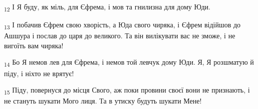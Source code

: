 \begin{tcolorbox}
\textsubscript{12} І Я буду, як міль, для Єфрема, і мов та гнилизна для дому Юди.
\end{tcolorbox}
\begin{tcolorbox}
\textsubscript{13} І побачив Єфрем свою хворість, а Юда свого чиряка, і Єфрем відійшов до Ашшура і послав до царя до великого. Та він вилікувати вас не зможе, і не вигоїть вам чиряка!
\end{tcolorbox}
\begin{tcolorbox}
\textsubscript{14} Бо Я немов лев для Єфрема, і немов той левчук дому Юди. Я, Я розшматую й піду, і ніхто не врятує!
\end{tcolorbox}
\begin{tcolorbox}
\textsubscript{15} Піду, повернуся до місця Свого, аж поки провини своєї вони не признають, і не стануть шукати Мого лиця. Та в утиску будуть шукати Мене!
\end{tcolorbox}

